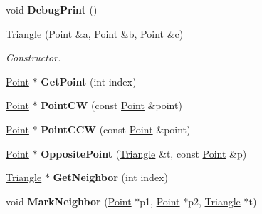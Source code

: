 \begin{DoxyCompactItemize}
\mbox{\label{classp2t_1_1Triangle_aeca5d9dadee27b9038618be9e450d030}} 
void {\bfseries Debug\+Print} ()
\item 
\mbox{\label{classp2t_1_1Triangle_a9f057674cc3e7c0ed28c8e1237f55bea}} 
\hyperlink{classp2t_1_1Triangle_a9f057674cc3e7c0ed28c8e1237f55bea}{Triangle} (\hyperlink{structp2t_1_1Point}{Point} \&a, \hyperlink{structp2t_1_1Point}{Point} \&b, \hyperlink{structp2t_1_1Point}{Point} \&c)
\begin{DoxyCompactList}\small\item\em Constructor. \end{DoxyCompactList}\item 
\mbox{\label{classp2t_1_1Triangle_a59f8a07ca6ebc263e520c8150ddf8af6}} 
\hyperlink{structp2t_1_1Point}{Point} $\ast$ {\bfseries Get\+Point} (int index)
\item 
\mbox{\label{classp2t_1_1Triangle_aa3a4191c599c3898a5012b6f1ac9740f}} 
\hyperlink{structp2t_1_1Point}{Point} $\ast$ {\bfseries Point\+CW} (const \hyperlink{structp2t_1_1Point}{Point} \&point)
\item 
\mbox{\label{classp2t_1_1Triangle_acbe58e9370a80de2d5f0efc01c42ed11}} 
\hyperlink{structp2t_1_1Point}{Point} $\ast$ {\bfseries Point\+C\+CW} (const \hyperlink{structp2t_1_1Point}{Point} \&point)
\item 
\mbox{\label{classp2t_1_1Triangle_a1a9026da85e68e39920a010c18b8c129}} 
\hyperlink{structp2t_1_1Point}{Point} $\ast$ {\bfseries Opposite\+Point} (\hyperlink{classp2t_1_1Triangle}{Triangle} \&t, const \hyperlink{structp2t_1_1Point}{Point} \&p)
\item 
\mbox{\label{classp2t_1_1Triangle_a7a1ef747cf193dae4c06113d005be801}} 
\hyperlink{classp2t_1_1Triangle}{Triangle} $\ast$ {\bfseries Get\+Neighbor} (int index)
\item 
\mbox{\label{classp2t_1_1Triangle_abc085307796eddc8e56a4502244f23e3}} 
void {\bfseries Mark\+Neighbor} (\hyperlink{structp2t_1_1Point}{Point} $\ast$p1, \hyperlink{structp2t_1_1Point}{Point} $\ast$p2, \hyperlink{classp2t_1_1Triangle}{Triangle} $\ast$t)

\end{DoxyCompactItemize}

